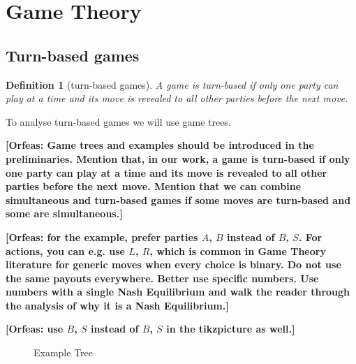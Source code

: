 \documentclass{cacthesis}
\newcommand{\authnote}[3]{{ \footnotesize \textbf{#1[#2: #3]~}}}
\newcommand{\orfnote}[1]{\authnote{\color{blue}}{Orfeas}{#1}}
\newtheorem{definition}{Definition}
\begin{document}
\section{Game Theory}
\subsection{Turn-based games}
\begin{definition}[turn-based games]
\label{def:turn-based-game}
A game is turn-based if only one party can play at a time and its move is revealed
to all other parties before the next move.
\end{definition}
To analyse turn-based games we will use game trees.\newline

\orfnote{Game trees and
examples should be introduced in the preliminaries. Mention that, in our work, a
game is turn-based if only one party can play at a time and its move is revealed
to all other parties before the next move. Mention that we can combine
simultaneous and turn-based games if some moves are turn-based and some are
simultaneous.}


\orfnote{for the example, prefer parties $A$, $B$ instead
of $B$, $S$. For actions, you can e.g. use $L$, $R$, which is common in Game
Theory literature for generic moves when every choice is binary. Do not use the
same payouts everywhere. Better use specific numbers. Use numbers with a single
Nash Equilibrium and walk the reader through the analysis of why it is a Nash
Equilibrium.}

\orfnote{use $B$, $S$ instead of $B$, $S$ in the tikzpicture as well.}

\begin{figure}[htb!]
    \centering
    \caption{Example Tree}
    \label{fig:example-tree}
\end{figure}
\end{document}

